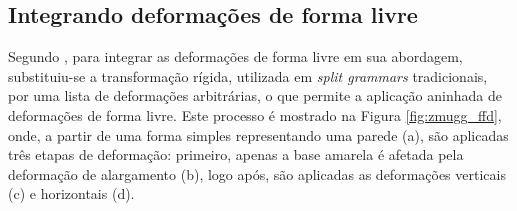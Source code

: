 \begin{figure}[h!]
	\centering
	\captionsetup{width=15cm}
	{}	
\end{figure}

\subsection{Integrando deformações de forma livre}
\label{sec:zmugg2014_sec3}

Segundo , para integrar as deformações de forma livre em sua abordagem, substituiu-se a transformação rígida, utilizada em \textit{split grammars} tradicionais, por uma lista de deformações arbitrárias, o que permite a aplicação aninhada de deformações de forma livre. Este processo é mostrado na Figura \ref{fig:zmugg_ffd}, onde, a partir de uma forma simples representando uma parede (a), são aplicadas três etapas de deformação: primeiro, apenas a base amarela é afetada pela deformação de alargamento (b), logo após, são aplicadas as deformações verticais (c) e horizontais (d).

\begin{figure}[h!]
	\centering
	\captionsetup{width=15cm}
	{}	
\end{figure}

